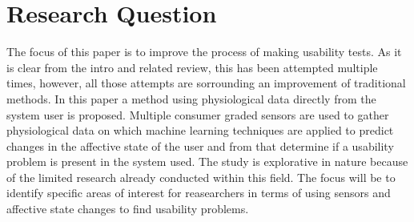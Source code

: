\section{Research Question}
The focus of this paper is to improve the process of making usability tests. 
As it is clear from the intro and related review, this has been attempted multiple times, however, all those attempts are sorrounding an improvement of traditional methods.
In this paper a method using physiological data directly from the system user is proposed.
Multiple consumer graded sensors are used to gather physiological data on which machine learning techniques are applied to predict changes in the affective state of the user and from that determine if a usability problem is present in the system used. The study is explorative in nature because of the limited research already conducted within this field. 
The focus will be to identify specific areas of interest for reasearchers in terms of using sensors and affective state changes to find usability problems.
